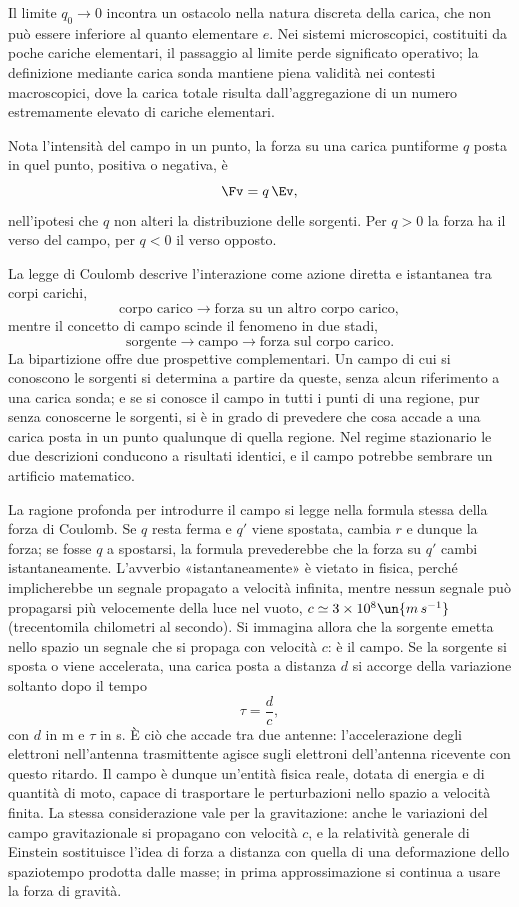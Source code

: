 \documentclass[main.tex]{subfiles}
\begin{document}
Il limite $q_0\to0$ incontra un ostacolo nella natura discreta della carica, che non può essere inferiore al quanto elementare $e$. Nei sistemi microscopici, costituiti da poche cariche elementari, il passaggio al limite perde significato operativo; la definizione mediante carica sonda mantiene piena validità nei contesti macroscopici, dove la carica totale risulta dall'aggregazione di un numero estremamente elevato di cariche elementari.

Nota l'intensità del campo in un punto, la forza su una carica puntiforme $q$ posta in quel punto, positiva o negativa, è
\[
\Fv=q\,\Ev ,
\]
nell'ipotesi che $q$ non alteri la distribuzione delle sorgenti. Per $q>0$ la forza ha il verso del campo, per $q<0$ il verso opposto.

La legge di Coulomb descrive l'interazione come azione diretta e istantanea tra corpi carichi,
\[
\text{corpo carico} \longrightarrow \text{forza su un altro corpo carico},
\]
mentre il concetto di campo scinde il fenomeno in due stadi,
\[
\text{sorgente} \longrightarrow \text{campo} \longrightarrow \text{forza sul corpo carico}.
\]
La bipartizione offre due prospettive complementari. Un campo di cui si conoscono le sorgenti si determina a partire da queste, senza alcun riferimento a una carica sonda; e se si conosce il campo in tutti i punti di una regione, pur senza conoscerne le sorgenti, si è in grado di prevedere che cosa accade a una carica posta in un punto qualunque di quella regione. Nel regime stazionario le due descrizioni conducono a risultati identici, e il campo potrebbe sembrare un artificio matematico.

La ragione profonda per introdurre il campo si legge nella formula stessa della forza di Coulomb. Se $q$ resta ferma e $q'$ viene spostata, cambia $r$ e dunque la forza; se fosse $q$ a spostarsi, la formula prevederebbe che la forza su $q'$ cambi istantaneamente. L'avverbio «istantaneamente» è vietato in fisica, perché implicherebbe un segnale propagato a velocità infinita, mentre nessun segnale può propagarsi più velocemente della luce nel vuoto, $c\simeq3\times10^{8}\un{m\,s^{-1}}$ (trecentomila chilometri al secondo). Si immagina allora che la sorgente emetta nello spazio un segnale che si propaga con velocità $c$: è il campo. Se la sorgente si sposta o viene accelerata, una carica posta a distanza $d$ si accorge della variazione soltanto dopo il tempo
\[
\tau=\frac{d}{c},
\]
con $d$ in m e $\tau$ in s. È ciò che accade tra due antenne: l'accelerazione degli elettroni nell'antenna trasmittente agisce sugli elettroni dell'antenna ricevente con questo ritardo. Il campo è dunque un'entità fisica reale, dotata di energia e di quantità di moto, capace di trasportare le perturbazioni nello spazio a velocità finita. La stessa considerazione vale per la gravitazione: anche le variazioni del campo gravitazionale si propagano con velocità $c$, e la relatività generale di Einstein sostituisce l'idea di forza a distanza con quella di una deformazione dello spaziotempo prodotta dalle masse; in prima approssimazione si continua a usare la forza di gravità.
\end{document}
